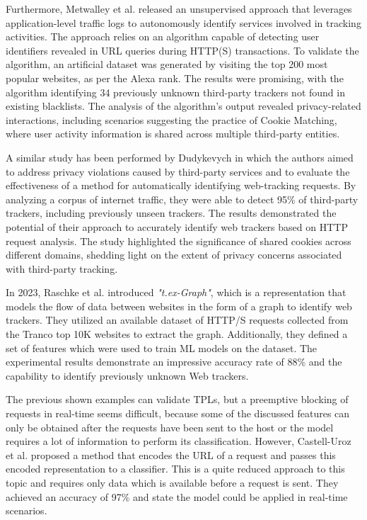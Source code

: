 Furthermore, Metwalley et al. \cite{metwalley2015unsupervised} released an unsupervised approach that leverages application-level
traffic logs to autonomously identify services involved in tracking activities.
The approach relies on an algorithm capable of detecting user identifiers revealed in URL queries during HTTP(S) transactions.
To validate the algorithm, an artificial dataset was generated by visiting the top 200 most popular websites, as per the Alexa rank.
The results were promising, with the algorithm identifying 34 previously
unknown third-party trackers not found in existing blacklists. The analysis of the algorithm's output revealed privacy-related
interactions, including scenarios suggesting the practice of Cookie Matching, where user activity information is shared across
multiple third-party entities.

A similar study has been performed by Dudykevych \cite{dudykevych2016detecting} in which the authors aimed to address privacy violations caused by third-party services and to evaluate the effectiveness
of a method for automatically identifying web-tracking requests. By analyzing a corpus of internet traffic, they were able
to detect 95\% of third-party trackers, including previously unseen trackers. The results demonstrated the potential of
their approach to accurately identify web trackers based on HTTP request analysis. The study highlighted the significance
of shared cookies across different domains, shedding light on the extent of privacy concerns associated with third-party tracking.

In 2023, Raschke et al. \cite{raschke2023} introduced \emph{"t.ex-Graph"}, which is a representation that models the flow of data
between websites in the form of a graph to identify web trackers. They utilized an available dataset
of HTTP/S requests collected from the Tranco \cite{pochat2018tranco} top 10K websites to extract the graph. Additionally, they defined a set of features
which were used to train ML models on the dataset. The experimental results demonstrate an impressive accuracy rate of 88\% and the capability to identify previously unknown Web trackers.

The previous shown examples can validate TPLs, but a preemptive blocking of requests in real-time seems difficult, because some 
of the discussed features can only be obtained after the requests have been sent to the host or the model requires a lot of information
to perform its classification. However, Castell-Uroz et al. \cite{castell2020url} proposed a method that encodes the URL of a request and passes this
encoded representation to a classifier. This is a quite reduced approach to this topic and requires only data which is available before a request
is sent. They achieved an accuracy of 97\% and state the model could be applied in real-time scenarios.

